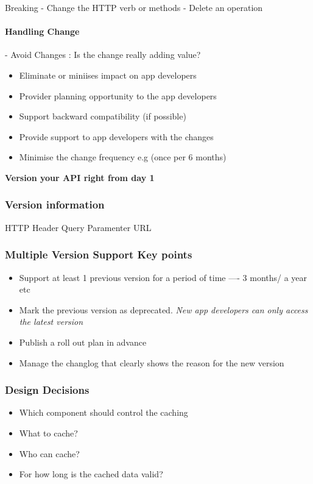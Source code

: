\documentclass[a4paper, 11pt]{book}
\begin{document}
    Breaking
    - Change the HTTP verb or methods
    - Delete an operation

    \paragraph{Handling Change}
    - Avoid Changes : Is the change really adding value?
    \begin{itemize}
        \item Eliminate or miniises impact on app developers
        \item Provider planning opportunity to the app developers
        \item Support backward compatibility (if possible)
        \item Provide support to app developers with the changes
        \item Minimise the change frequency e.g (once per 6 months)
    \end{itemize}
    \textbf{Version your API right from day 1}

    \subsubsection{Version information}
    HTTP Header
    Query Paramenter
    URL

    \subsubsection{Multiple Version Support Key points}
    \begin{itemize}
        \item Support at least 1 previous version for a period of time ---- 3 months/ a year etc
        \item Mark the previous version as deprecated. \textit{New app developers can only access the latest version}
        \item Publish a roll out plan in advance
        \item Manage the changlog that clearly shows the reason for the new version
    \end{itemize}

    \subsubsection{Design Decisions}
    \begin{itemize}
        \item Which component should control the caching
        \item What to cache?
        \item Who can cache?
        \item For how long is the cached data valid?
    \end{itemize}
\end{document}

